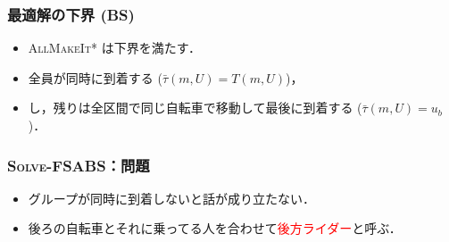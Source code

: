\documentclass[dvipdfmx,12pt]{beamer}
\begin{document}

\begin{frame}
  \frametitle{最適解の下界 (BS)}
  \begin{itemize}
  \item \textsc{AllMakeIt*} は下界を満たす．
  \item 全員が同時に到着する ($\bar\tau(m, U) = T(m, U)$)，
  \item {}し，残りは全区間で同じ自転車で移動して最後に到着する ($\bar\tau(m, U) = u_b$)．
  \end{itemize}
\end{frame}

\begin{frame}
  \frametitle{\textsc{Solve-FSABS}：問題}
  \begin{itemize}
  \item グループが同時に到着しないと話が成り立たない．
  \item<2> 後ろの自転車とそれに乗ってる人を合わせて\textcolor{red}{後方ライダー}と呼ぶ．
  \end{itemize}
\end{frame}



\end{document}
